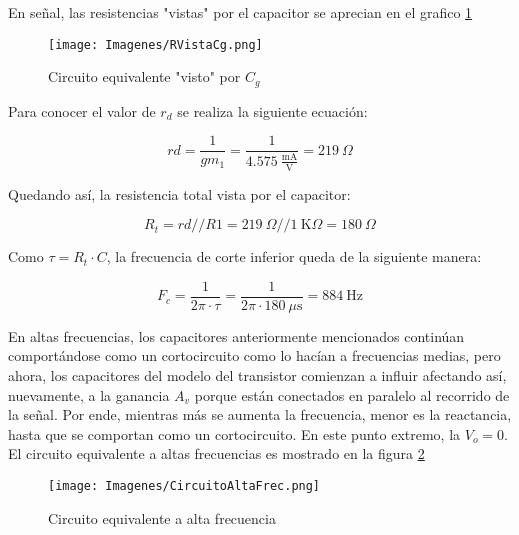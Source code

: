 \documentclass[a4paper,10pt]{article}
\begin{document}
				\indent En señal, las resistencias "vistas" por el capacitor se aprecian en el grafico \ref{pimg005}
				
				\begin{figure}[!htb]
					\centering
						\texttt{[image: Imagenes/RVistaCg.png]}
						\caption{Circuito equivalente "visto" por $C_g$} \label{pimg005}
				\end{figure}
				
				Para conocer el valor de $r_d$ se realiza la siguiente ecuación:
				
				\begin{equation}
					rd = \frac{1}{gm_1} = \frac{1}{4.575~\frac{\text{mA}}{\text{V}}} = 219~\Omega
				\end{equation}
				
				Quedando así, la resistencia total vista por el capacitor:
				
				\begin{equation}
					R_t = rd // R1 = 219~\Omega // 1~\text{K}\Omega = 180~\Omega
				\end{equation}
				
				Como $\tau = R_t \cdot C$, la frecuencia de corte inferior queda de la siguiente manera:

				\begin{equation}
					F_c = \frac{1}{2\pi \cdot \tau} = \frac{1}{2 \pi \cdot 180~\mu \text{s}} = 884~\text{Hz} \label{eq011}
				\end{equation}

				\indent En altas frecuencias, los capacitores anteriormente mencionados continúan comportándose como un cortocircuito como lo hacían a frecuencias 
				medias, pero ahora, los capacitores del modelo del transistor comienzan a influir afectando así, nuevamente, a la ganancia $A_v$ porque están 
				conectados en paralelo al recorrido de la señal. Por ende, mientras más se aumenta la frecuencia, menor es la reactancia, hasta que se comportan 
				como un cortocircuito. En este punto extremo, la $V_o = 0$. \\
				\indent El circuito equivalente a altas frecuencias es mostrado en la figura \ref{pimg006} \\
				
				\begin{figure}[!htb]
					\centering
						\texttt{[image: Imagenes/CircuitoAltaFrec.png]}
						\caption{Circuito equivalente a alta frecuencia} \label{pimg006}
				\end{figure}
				
\end{document}
